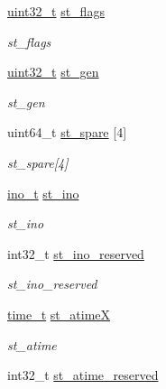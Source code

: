 \begin{DoxyCompactItemize}
\hyperlink{Type_8hh_a435d1572bf3f880d55459d9805097f62}{uint32\_\-t} \hyperlink{structTru64__F64_1_1F64__stat_a2bac91973217293ac3be9cd5f402a819}{st\_\-flags}
\begin{DoxyCompactList}\small\item\em st\_\-flags \item\end{DoxyCompactList}\item 
\hyperlink{Type_8hh_a435d1572bf3f880d55459d9805097f62}{uint32\_\-t} \hyperlink{structTru64__F64_1_1F64__stat_a5c579182b97b4e228d986b8b856d44ce}{st\_\-gen}
\begin{DoxyCompactList}\small\item\em st\_\-gen \item\end{DoxyCompactList}\item 
uint64\_\-t \hyperlink{structTru64__F64_1_1F64__stat_ac39ec7752207ee408453ca20150ce13b}{st\_\-spare} \mbox{[}4\mbox{]}
\begin{DoxyCompactList}\small\item\em st\_\-spare\mbox{[}4\mbox{]} \item\end{DoxyCompactList}\item 
\hyperlink{classTru64_aed4e918b44240739869c4bdb1c4787a9}{ino\_\-t} \hyperlink{structTru64__F64_1_1F64__stat_ac4a6c013b12dad2fb1bce6bd99d66f6f}{st\_\-ino}
\begin{DoxyCompactList}\small\item\em st\_\-ino \item\end{DoxyCompactList}\item 
int32\_\-t \hyperlink{structTru64__F64_1_1F64__stat_ae8ea2ae37bd5c50619c04b9f2a10c157}{st\_\-ino\_\-reserved}
\begin{DoxyCompactList}\small\item\em st\_\-ino\_\-reserved \item\end{DoxyCompactList}\item 
\hyperlink{classTru64_a3346b04b0420b32ccf6b706551b70762}{time\_\-t} \hyperlink{structTru64__F64_1_1F64__stat_a6034c5ae284e55dd118804aeb619f5b9}{st\_\-atimeX}
\begin{DoxyCompactList}\small\item\em st\_\-atime \item\end{DoxyCompactList}\item 
int32\_\-t \hyperlink{structTru64__F64_1_1F64__stat_a51c2cc99b0e93b1a4e80e185d98ae589}{st\_\-atime\_\-reserved}

\end{DoxyCompactItemize}
